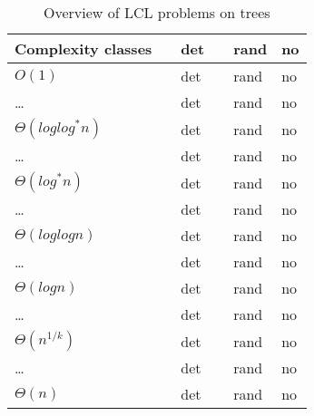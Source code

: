 \begin{table}
\begin{tabular}{|p{1.90cm}|p{1.90cm}|p{1.90cm}|p{1.90cm}|p{1.90cm}|p{1.90cm}|}
    Complexity classes &  & det &  & rand & no \\
  \hline
    $O(1)$ &  & det &  & rand & no \\
  \hline
    \dots &  & det &  & rand & no \\
  \hline
    $\Theta(log log^* n)$ &  & det &  & rand & no \\
  \hline
    \dots &  & det &  & rand & no \\
  \hline
    $\Theta(log^* n)$ &  & det &  & rand & no \\
  \hline
    \dots &  & det &  & rand & no \\
  \hline
    $\Theta(log log n)$ &  & det &  & rand & no \\
  \hline
    \dots &  & det &  & rand & no \\
  \hline
    $\Theta(log n)$ &  & det &  & rand & no \\
  \hline
    \dots &  & det &  & rand & no \\
  \hline
    $\Theta(n^{1/k})$ &  & det &  & rand & no \\
  \hline
    \dots &  & det &  & rand & no \\
  \hline
    $\Theta(n)$ &  & det &  & rand & no \\
  \hline

  \end{tabular} %
  \caption{Overview of LCL problems on trees}
  \label{table:courses}
\end{table} %
